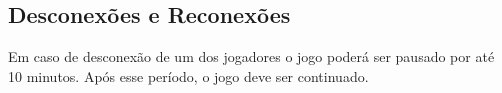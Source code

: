 \subsection{Desconexões e Reconexões}

Em caso de desconexão de um dos jogadores o jogo poderá ser pausado por até 10 minutos. Após esse período, o jogo deve ser continuado.